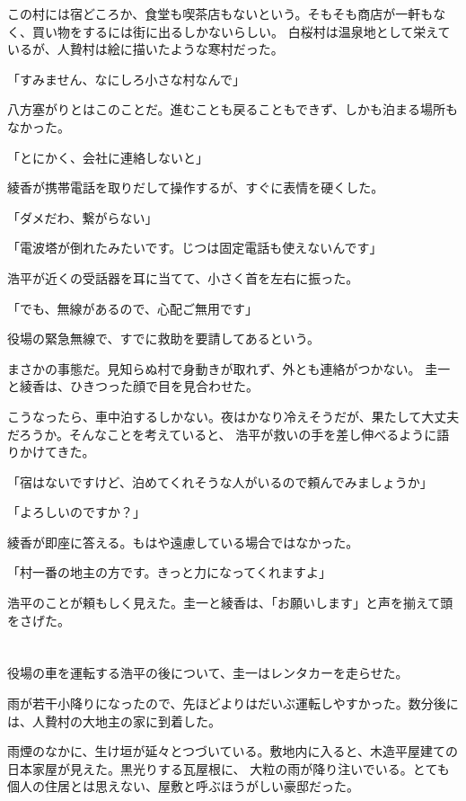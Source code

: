 ﻿\documentclass[
    book,tate,
    line_length=30zw,
    jafontsize=12pt,
    paper=b5j,
    landscape,
    ]{jlreq}
\begin{document}
この村には宿どころか、食堂も喫茶店もないという。そもそも商店が一軒もなく、買い物をするには街に出るしかないらしい。
白桜村は温泉地として栄えているが、人贄村は絵に描いたような寒村だった。

「すみません、なにしろ小さな村なんで」

八方塞がりとはこのことだ。進むことも戻ることもできず、しかも泊まる場所もなかった。

「とにかく、会社に連絡しないと」

綾香が携帯電話を取りだして操作するが、すぐに表情を硬くした。

「ダメだわ、繋がらない」

「電波塔が倒れたみたいです。じつは固定電話も使えないんです」

浩平が近くの受話器を耳に当てて、小さく首を左右に振った。

「でも、無線があるので、心配ご無用です」

役場の緊急無線で、すでに救助を要請してあるという。

まさかの事態だ。見知らぬ村で身動きが取れず、外とも連絡がつかない。 圭一と綾香は、ひきつった顔で目を見合わせた。

こうなったら、車中泊するしかない。夜はかなり冷えそうだが、果たして大丈夫だろうか。そんなことを考えていると、 
浩平が救いの手を差し伸べるように語りかけてきた。

「宿はないですけど、泊めてくれそうな人がいるので頼んでみましょうか」

「よろしいのですか？」

綾香が即座に答える。もはや遠慮している場合ではなかった。

「村一番の地主の方です。きっと力になってくれますよ」

浩平のことが頼もしく見えた。圭一と綾香は、「お願いします」と声を揃えて頭をさげた。

\section*{}

役場の車を運転する浩平の後について、圭一はレンタカーを走らせた。

雨が若干小降りになったので、先ほどよりはだいぶ運転しやすかった。数分後には、人贄村の大地主の家に到着した。 

雨煙のなかに、生け垣が延々とつづいている。敷地内に入ると、木造平屋建ての日本家屋が見えた。黒光りする瓦屋根に、
大粒の雨が降り注いでいる。とても個人の住居とは思えない、屋敷と呼ぶほうがしい豪邸だった。
\end{document}
